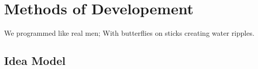 \section{Methods of Developement}
We programmed like real men; With butterflies on sticks creating water ripples.

\subsection{Idea Model}

